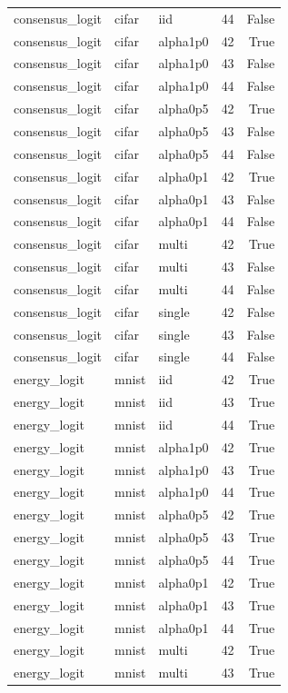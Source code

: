 \begin{tabular}{lllrr}
consensus\_logit & cifar & iid & 44 & False \\
consensus\_logit & cifar & alpha1p0 & 42 & True \\
consensus\_logit & cifar & alpha1p0 & 43 & False \\
consensus\_logit & cifar & alpha1p0 & 44 & False \\
consensus\_logit & cifar & alpha0p5 & 42 & True \\
consensus\_logit & cifar & alpha0p5 & 43 & False \\
consensus\_logit & cifar & alpha0p5 & 44 & False \\
consensus\_logit & cifar & alpha0p1 & 42 & True \\
consensus\_logit & cifar & alpha0p1 & 43 & False \\
consensus\_logit & cifar & alpha0p1 & 44 & False \\
consensus\_logit & cifar & multi & 42 & True \\
consensus\_logit & cifar & multi & 43 & False \\
consensus\_logit & cifar & multi & 44 & False \\
consensus\_logit & cifar & single & 42 & False \\
consensus\_logit & cifar & single & 43 & False \\
consensus\_logit & cifar & single & 44 & False \\
energy\_logit & mnist & iid & 42 & True \\
energy\_logit & mnist & iid & 43 & True \\
energy\_logit & mnist & iid & 44 & True \\
energy\_logit & mnist & alpha1p0 & 42 & True \\
energy\_logit & mnist & alpha1p0 & 43 & True \\
energy\_logit & mnist & alpha1p0 & 44 & True \\
energy\_logit & mnist & alpha0p5 & 42 & True \\
energy\_logit & mnist & alpha0p5 & 43 & True \\
energy\_logit & mnist & alpha0p5 & 44 & True \\
energy\_logit & mnist & alpha0p1 & 42 & True \\
energy\_logit & mnist & alpha0p1 & 43 & True \\
energy\_logit & mnist & alpha0p1 & 44 & True \\
energy\_logit & mnist & multi & 42 & True \\
energy\_logit & mnist & multi & 43 & True \\

\end{tabular}
